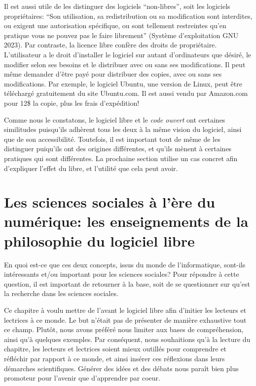 \documentclass[
  letterpaper,
]{scrbook}
\begin{document}
Il est aussi utile de les distinguer des logiciels ``non-libres'', soit
les logiciels propriétaires: ``Son utilisation, sa redistribution ou sa
modification sont interdites, ou exigent une autorisation spécifique, ou
sont tellement restreintes qu'en pratique vous ne pouvez pas le faire
librement'' (Système d'exploitation GNU 2023). Par contraste, la licence
libre confère des droits de propriétaire. L'utilisateur a le droit
d'installer le logiciel sur autant d'ordinateurs que désiré, le modifier
selon ses besoins et le distribuer avec ou sans ses modifications. Il
peut même demander d'être payé pour distribuer des copies, avec ou sans
ses modifications. Par exemple, le logiciel Ubuntu, une version de
Linux, peut être téléchargé gratuitement du site Ubuntu.com. Il est
aussi vendu par Amazon.com pour 12\$ la copie, plus les frais
d'expédition!

Comme nous le constatons, le logiciel libre et le \emph{code ouvert} ont
certaines similitudes puisqu'ils adhèrent tous les deux à la même vision
du logiciel, ainsi que de son accessibilité. Toutefois, il est important
tout de même de les distinguer puiqu'ils ont des origines différentes,
et qu'ils mènent à certaines pratiques qui sont différentes. La
prochaine section utilise un cas concret afin d'expliquer l'effet du
libre, et l'utilité que cela peut avoir.

\hypertarget{les-sciences-sociales-uxe0-luxe8re-du-numuxe9rique-les-enseignements-de-la-philosophie-du-logiciel-libre}{%
\section{Les sciences sociales à l'ère du numérique: les enseignements
de la philosophie du logiciel
libre}\label{les-sciences-sociales-uxe0-luxe8re-du-numuxe9rique-les-enseignements-de-la-philosophie-du-logiciel-libre}}

En quoi est-ce que ces deux concepts, issus du monde de l'informatique,
sont-ils intéressants et/ou important pour les sciences sociales? Pour
répondre à cette question, il est important de retourner à la base, soit
de se questionner sur qu'est la recherche dans les sciences sociales.

Ce chapitre à voulu mettre de l'avant le logiciel libre afin d'initier
les lecteurs et lectrices à ce monde. Le but n'était pas de présenter de
manière exhaustive tout ce champ. Plutôt, nous avons préféré nous
limiter aux bases de compréhension, ainsi qu'à quelques exemples. Par
conséquent, nous souhaitions qu'à la lecture du chapitre, les lecteurs
et lectrices soient mieux outillés pour comprendre et réfléchir par
rapport à ce monde, et ainsi insérer ces réflexions dans leurs démarches
scientifiques. Générer des idées et des débats nous paraît bien plus
promoteur pour l'avenir que d'apprendre par coeur.
\end{document}
